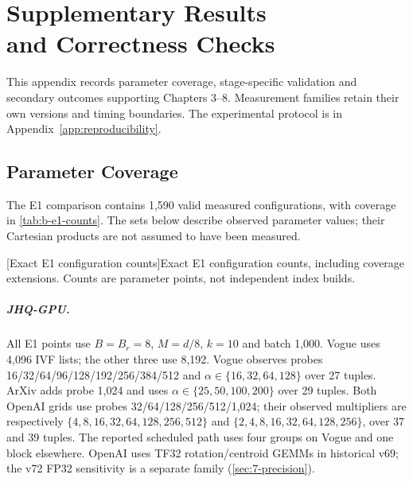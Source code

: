 \chapter[Supplementary Results and Correctness Checks]{Supplementary Results\\and Correctness Checks}
\label{app:supplementary}
This appendix records parameter coverage, stage-specific validation and
secondary outcomes supporting Chapters 3--8. Measurement families retain
their own versions and timing boundaries. The experimental protocol is in
Appendix~\ref{app:reproducibility}.

\section{Parameter Coverage}
\label{sec:b-grids}
The E1 comparison contains 1,590 valid measured configurations, with
coverage in \cref{tab:b-e1-counts}. The sets below describe observed parameter values;
their Cartesian products are not assumed to have been measured.

\par\medskip\noindent\begin{minipage}{\linewidth}
\centering\captionsetup{hypcap=false}
[Exact E1 configuration counts]{Exact E1 configuration counts, including coverage
extensions. Counts are parameter points, not independent index builds.}
\label{tab:b-e1-counts}
\footnotesize\setlength{\tabcolsep}{4pt}

\end{minipage}\par\medskip

\begingroup\raggedright
\paragraph{JHQ-GPU.}
All E1 points use $B=B_r=8$, $M=d/8$, $k=10$ and batch 1,000.
Vogue uses 4,096 IVF lists; the other three use 8,192.
Vogue observes probes 16/\allowbreak{}32/\allowbreak{}64/\allowbreak{}96/\allowbreak{}128/\allowbreak{}192/\allowbreak{}256/\allowbreak{}384/\allowbreak{}512 and
$\alpha\in\{16,32,64,128\}$ over 27 tuples. ArXiv adds probe 1,024
and uses $\alpha\in\{25,50,100,200\}$ over 29 tuples.
Both OpenAI grids use probes 32/\allowbreak{}64/\allowbreak{}128/\allowbreak{}256/\allowbreak{}512/\allowbreak{}1,024;
their observed multipliers are respectively
$\{4,8,16,32,64,128,256,512\}$ and
$\{2,4,8,16,32,64,128,256\}$, over 37 and 39 tuples.
The reported scheduled path uses four groups on Vogue and one block
elsewhere. OpenAI uses TF32 rotation/centroid GEMMs in historical v69;
the v72 FP32 sensitivity is a separate family (\cref{sec:7-precision}).


